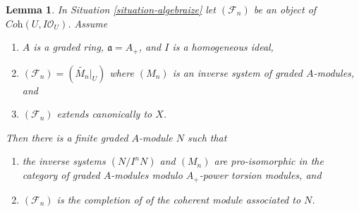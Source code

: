 \documentclass{stacks-project}
\theoremstyle{plain}
\newtheorem{lemma}[subsection]{Lemma}
\theoremstyle{definition}
\theoremstyle{remark}
\numberwithin{equation}{subsection}
\begin{document}
\begin{lemma}
\label{lemma-Gm-equivariant-extend-canonically}
In Situation \ref{situation-algebraize} let $(\mathcal{F}_n)$ be an
object of $\textit{Coh}(U, I\mathcal{O}_U)$. Assume
\begin{enumerate}
\item $A$ is a graded ring, $\mathfrak a = A_+$, and
$I$ is a homogeneous ideal,
\item $(\mathcal{F}_n) = (\widetilde{M_n}|_U)$ where $(M_n)$
is an inverse system of graded $A$-modules, and
\item $(\mathcal{F}_n)$ extends canonically to $X$.
\end{enumerate}
Then there is a finite graded $A$-module $N$ such that
\begin{enumerate}
\item[(a)] the inverse systems $(N/I^nN)$ and $(M_n)$ are pro-isomorphic
in the category of graded $A$-modules modulo $A_+$-power torsion
modules, and
\item[(b)] $(\mathcal{F}_n)$ is the completion of of the coherent
module associated to $N$.
\end{enumerate}
\end{lemma}
\end{document}
